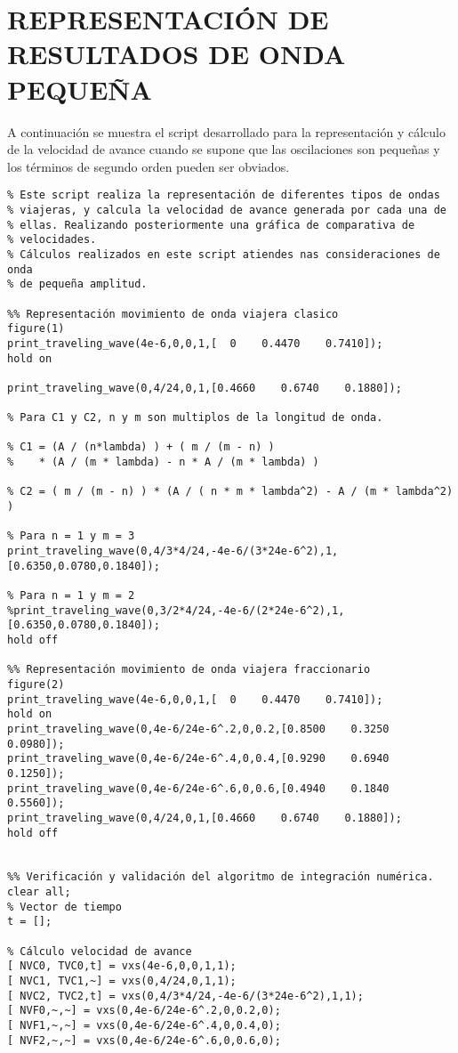 \section{REPRESENTACIÓN DE RESULTADOS DE ONDA PEQUEÑA} \label{anex:Anexo2}
A continuación se muestra el script desarrollado para la representación y cálculo de la velocidad de avance cuando se supone que las oscilaciones son pequeñas y los términos de segundo orden pueden ser obviados.

\begin{lstlisting}[]
%% VERIFICACIÓN Y ANÁLISIS VXS
% Este script realiza la representación de diferentes tipos de ondas
% viajeras, y calcula la velocidad de avance generada por cada una de
% ellas. Realizando posteriormente una gráfica de comparativa de
% velocidades.
% Cálculos realizados en este script atiendes nas consideraciones de onda
% de pequeña amplitud.

%% Representación movimiento de onda viajera clasico
figure(1)
print_traveling_wave(4e-6,0,0,1,[  0    0.4470    0.7410]);
hold on

print_traveling_wave(0,4/24,0,1,[0.4660    0.6740    0.1880]);

% Para C1 y C2, n y m son multiplos de la longitud de onda.  

% C1 = (A / (n*lambda) ) + ( m / (m - n) ) 
%    * (A / (m * lambda) - n * A / (m * lambda) )

% C2 = ( m / (m - n) ) * (A / ( n * m * lambda^2) - A / (m * lambda^2) )

% Para n = 1 y m = 3
print_traveling_wave(0,4/3*4/24,-4e-6/(3*24e-6^2),1,[0.6350,0.0780,0.1840]);

% Para n = 1 y m = 2
%print_traveling_wave(0,3/2*4/24,-4e-6/(2*24e-6^2),1,[0.6350,0.0780,0.1840]);
hold off

%% Representación movimiento de onda viajera fraccionario
figure(2)
print_traveling_wave(4e-6,0,0,1,[  0    0.4470    0.7410]);
hold on
print_traveling_wave(0,4e-6/24e-6^.2,0,0.2,[0.8500    0.3250    0.0980]);
print_traveling_wave(0,4e-6/24e-6^.4,0,0.4,[0.9290    0.6940    0.1250]);
print_traveling_wave(0,4e-6/24e-6^.6,0,0.6,[0.4940    0.1840    0.5560]);
print_traveling_wave(0,4/24,0,1,[0.4660    0.6740    0.1880]);
hold off


%% Verificación y validación del algoritmo de integración numérica.
clear all;
% Vector de tiempo
t = [];

% Cálculo velocidad de avance
[ NVC0, TVC0,t] = vxs(4e-6,0,0,1,1);
[ NVC1, TVC1,~] = vxs(0,4/24,0,1,1);
[ NVC2, TVC2,t] = vxs(0,4/3*4/24,-4e-6/(3*24e-6^2),1,1);
[ NVF0,~,~] = vxs(0,4e-6/24e-6^.2,0,0.2,0);
[ NVF1,~,~] = vxs(0,4e-6/24e-6^.4,0,0.4,0);
[ NVF2,~,~] = vxs(0,4e-6/24e-6^.6,0,0.6,0);



\end{lstlisting}
